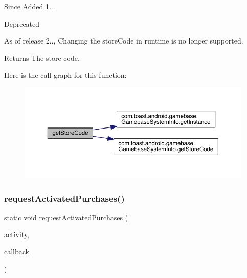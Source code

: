 \begin{DoxySince}{Since}
Added 1... 
\end{DoxySince}
\begin{DoxyRefDesc}{Deprecated}
\item[\hyperlink{deprecated__deprecated000002}{Deprecated}]As of release 2.., Changing the store\+Code in runtime is no longer supported. \end{DoxyRefDesc}
\begin{DoxyReturn}{Returns}
The store code. 
\end{DoxyReturn}
Here is the call graph for this function\+:
\nopagebreak
\begin{figure}[H]
\begin{center}
\leavevmode
\includegraphics[width=350pt]{classcom_1_1toast_1_1android_1_1gamebase_1_1_gamebase_1_1_purchase_ae6a7d3ccf1e7de6fb479485cce1ddeea_cgraph}
\end{center}
\end{figure}
\mbox{\label{classcom_1_1toast_1_1android_1_1gamebase_1_1_gamebase_1_1_purchase_a865b97145a008db8dcb97682b3cbd8f1}} 
\subsubsection{\texorpdfstring{request\+Activated\+Purchases()}{requestActivatedPurchases()}}
{\footnotesize\ttfamily static void request\+Activated\+Purchases (\begin{DoxyParamCaption}\item[{@Non\+Null final Activity}]{activity,  }\item[{@Non\+Null final \hyperlink{interfacecom_1_1toast_1_1android_1_1gamebase_1_1_gamebase_data_callback}{Gamebase\+Data\+Callback}$<$ List$<$ \hyperlink{classcom_1_1toast_1_1android_1_1gamebase_1_1base_1_1purchase_1_1_purchasable_receipt}{Purchasable\+Receipt} $>$$>$}]{callback }\end{DoxyParamCaption})\hspace{0.3cm}{\ttfamily [static]}}



